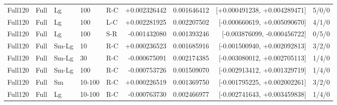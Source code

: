 \begin{longtable}{lllllrrrr}
Full120 & Full & Lg & 100 & R-C & +0.002326442 & 0.001646412 & [+0.000491238, +0.004289471] & 5/0/0 \\
Full120 & Full & Lg & 100 & L-C & +0.002281925 & 0.002207502 & [-0.000660619, +0.005090670] & 4/1/0 \\
Full120 & Full & Lg & 100 & S-R & -0.001432080 & 0.001393246 & [-0.003876099, -0.000456722] & 0/5/0 \\
Full120 & Full & Sm-Lg & 10 & R-C & +0.000236523 & 0.001685916 & [-0.001500940, +0.002092813] & 3/2/0 \\
Full120 & Full & Sm-Lg & 30 & R-C & -0.000675091 & 0.002174385 & [-0.003080012, +0.002705113] & 1/4/0 \\
Full120 & Full & Sm-Lg & 100 & R-C & -0.000753726 & 0.001509070 & [-0.002913412, +0.001329719] & 1/4/0 \\
Full120 & Full & Sm & 10-100 & R-C & +0.000226519 & 0.001369750 & [-0.001795225, +0.002002261] & 3/2/0 \\
Full120 & Full & Lg & 10-100 & R-C & -0.000763730 & 0.002466977 & [-0.002741643, +0.003459838] & 1/4/0 \\
\end{longtable}
\endgroup

